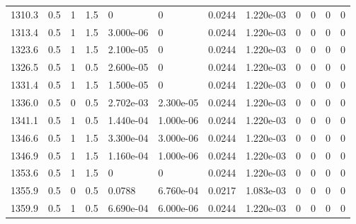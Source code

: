 \documentclass[preview]{standalone}
\begin{document}
{{{{{{{{\begin{tabular}{L{1.2cm}C{1.2cm} C{0.3cm}C{0.5cm} C{1.4cm}C{1.4cm} C{1.4cm}C{1.4cm} C{1.6cm}C{1.6cm} C{1.6cm}C{1.6cm}}
  1310.3  &   0.5  & 1     & 1.5 &  0  & 0  &  0.0244&   1.220e-03& 0 & 0   &  0 & 0  \\ 
  1313.4  &   0.5  & 1     & 1.5 &  3.000e-06  & 0  &  0.0244&   1.220e-03& 0 & 0   &  0 & 0  \\ 
  1323.6  &   0.5  & 1     & 1.5 &  2.100e-05  & 0  &  0.0244&   1.220e-03& 0 & 0   &  0 & 0  \\ 
  1326.5  &   0.5  & 1     & 0.5 &  2.600e-05  & 0  &  0.0244&   1.220e-03& 0 & 0   &  0 & 0  \\ 
  1331.4  &   0.5  & 1     & 1.5 &  1.500e-05  & 0  &  0.0244&   1.220e-03& 0 & 0   &  0 & 0  \\ 
  1336.0  &   0.5  & 0     & 0.5 &  2.702e-03  & 2.300e-05  &  0.0244&   1.220e-03& 0 & 0   &  0 & 0  \\ 
  1341.1  &   0.5  & 1     & 0.5 &  1.440e-04  & 1.000e-06  &  0.0244&   1.220e-03& 0 & 0   &  0 & 0  \\ 
  1346.6  &   0.5  & 1     & 1.5 &  3.300e-04  & 3.000e-06  &  0.0244&   1.220e-03& 0 & 0   &  0 & 0  \\ 
  1346.9  &   0.5  & 1     & 1.5 &  1.160e-04  & 1.000e-06  &  0.0244&   1.220e-03& 0 & 0   &  0 & 0  \\ 
  1353.6  &   0.5  & 1     & 1.5 &  0  & 0  &  0.0244&   1.220e-03& 0 & 0   &  0 & 0  \\ 
  1355.9  &   0.5  & 0     & 0.5 &  0.0788  & 6.760e-04  &  0.0217&   1.083e-03& 0 & 0   &  0 & 0  \\ 
  1359.9  &   0.5  & 1     & 0.5 &  6.690e-04  & 6.000e-06  &  0.0244&   1.220e-03& 0 & 0   &  0 & 0  \\ 
\hline 
\end{tabular} 

}}}}}}}}
\end{document}
